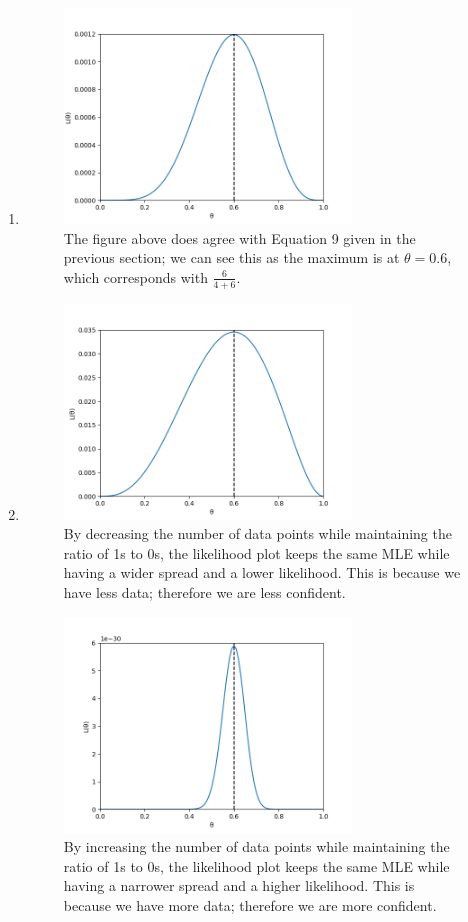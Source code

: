 \documentclass[11pt]{article}
\newcommand{\solution}[1]{{{\color{blue}{\bf Solution:} {#1}}}}
\begin{document}
\begin{enumerate}
\item
\solution{
\begin{figure}[!htbp]
    \centering
    \includegraphics[width=3in]{1c.png}
    \caption{The figure above does agree with Equation 9 given in the previous section; we can see this as the maximum is at $\theta = 0.6$, which corresponds with $\frac{6}{4 + 6}$.}
\end{figure}
}

\item
\solution{
\begin{figure}[!htbp]
    \centering
    \includegraphics[width=3in]{1di.png}
    \caption{By decreasing the number of data points while maintaining the ratio of 1s to 0s, the likelihood plot keeps the same MLE while having a wider spread and a lower likelihood. This is because we have less data; therefore we are less confident.}
\end{figure}
\newpage

\begin{figure}[!htbp]
    \centering
    \includegraphics[width=3in]{1dii.png}
    \caption{By increasing the number of data points while maintaining the ratio of 1s to 0s, the likelihood plot keeps the same MLE while having a narrower spread and a higher likelihood. This is because we have more data; therefore we are more confident.}
\end{figure}

}
\end{enumerate}
\end{document}
